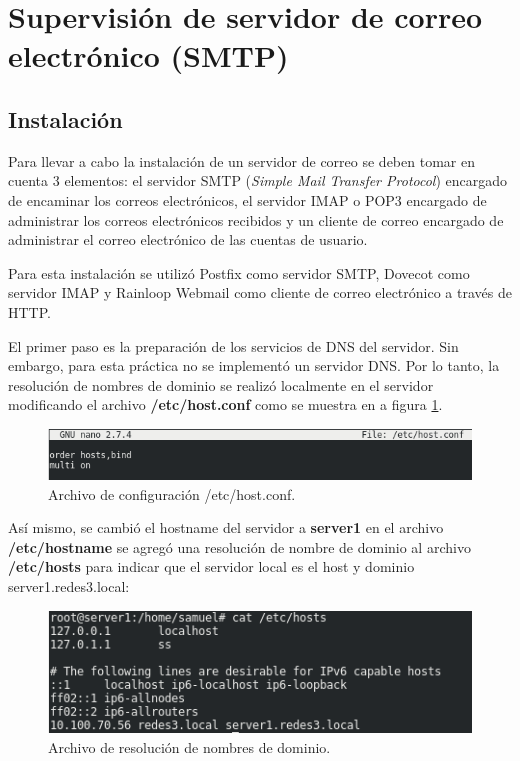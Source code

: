 \section{Supervisión de servidor de correo electrónico (SMTP)}
\subsection{Instalación}
Para llevar a cabo la instalación de un servidor de correo se deben tomar en cuenta 3 elementos: el servidor SMTP (\textit{Simple Mail Transfer Protocol}) encargado de encaminar los correos electrónicos, el servidor IMAP o POP3 encargado de administrar los correos electrónicos recibidos y un cliente de correo encargado de administrar el correo electrónico de las cuentas de usuario.

Para esta instalación se utilizó Postfix como servidor SMTP, Dovecot como servidor IMAP y Rainloop Webmail como cliente de correo electrónico a través de HTTP.

El primer paso es la preparación de los servicios de DNS del servidor. Sin embargo, para esta práctica no se implementó un servidor DNS. Por lo tanto, la resolución de nombres de dominio se realizó localmente en el servidor modificando el archivo \textbf{/etc/host.conf} como se muestra en a figura \ref{image:hostconf}.


\FloatBarrier
\begin{figure}[htbp!]
		\centering
			\includegraphics[width=.75 \textwidth]{images/hostconf}
		\caption{Archivo de configuración /etc/host.conf.}
		\label{image:hostconf}
\end{figure}
\FloatBarrier

Así mismo, se cambió el hostname del servidor a \textbf{server1} en el archivo \textbf{/etc/hostname} se agregó una resolución de nombre de dominio al archivo \textbf{/etc/hosts} para indicar que el servidor local es el host y dominio server1.redes3.local:

\FloatBarrier
\begin{figure}[htbp!]
		\centering
			\includegraphics[width=.75 \textwidth]{images/hosts}
		\caption{Archivo de resolución de nombres de dominio.}
		\label{image:hosts}
\end{figure}
\FloatBarrier


